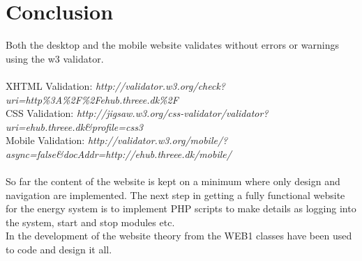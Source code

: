 \chapter{Conclusion}
Both the desktop and the mobile website validates without errors or warnings using the w3 validator. 
\\\\XHTML Validation: \textit{http://validator.w3.org/check?uri=http\%3A\%2F\%2Fehub.threee.dk\%2F}
\\CSS Validation: \textit{http://jigsaw.w3.org/css-validator/validator?uri=ehub.threee.dk\&profile=css3}
\\Mobile Validation: \textit{http://validator.w3.org/mobile/?async=false\&docAddr=http://ehub.threee.dk/mobile/}
\\\\So far the content of the website is kept on a minimum where only design and navigation are implemented. The next step in getting a fully functional website for the energy system is to implement PHP scripts to make details as logging into the system, start and stop modules etc.
\\In the development of the website theory from the WEB1 classes have been used to code and design it all.
